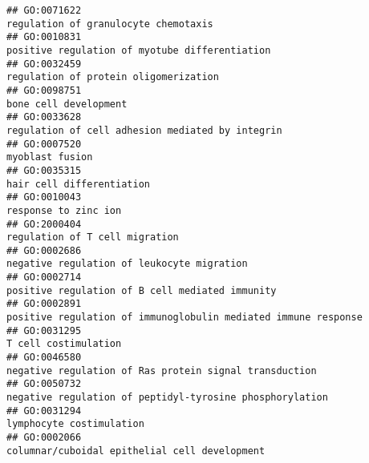 \documentclass[
]{article}
\begin{document}
\begin{verbatim}
## GO:0071622                                                                                                             regulation of granulocyte chemotaxis
## GO:0010831                                                                                                   positive regulation of myotube differentiation
## GO:0032459                                                                                                            regulation of protein oligomerization
## GO:0098751                                                                                                                            bone cell development
## GO:0033628                                                                                                 regulation of cell adhesion mediated by integrin
## GO:0007520                                                                                                                                  myoblast fusion
## GO:0035315                                                                                                                        hair cell differentiation
## GO:0010043                                                                                                                             response to zinc ion
## GO:2000404                                                                                                                   regulation of T cell migration
## GO:0002686                                                                                                       negative regulation of leukocyte migration
## GO:0002714                                                                                                  positive regulation of B cell mediated immunity
## GO:0002891                                                                                   positive regulation of immunoglobulin mediated immune response
## GO:0031295                                                                                                                             T cell costimulation
## GO:0046580                                                                                           negative regulation of Ras protein signal transduction
## GO:0050732                                                                                         negative regulation of peptidyl-tyrosine phosphorylation
## GO:0031294                                                                                                                         lymphocyte costimulation
## GO:0002066                                                                                                    columnar/cuboidal epithelial cell development

\end{verbatim}
\end{document}
